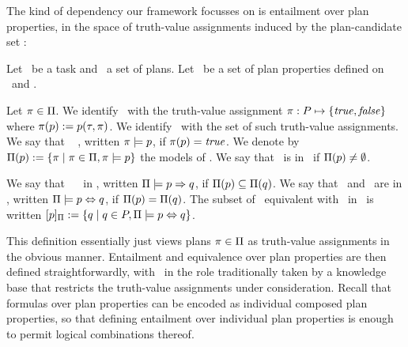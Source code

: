 The kind of dependency our framework focusses on is entailment over
plan properties, in the space of truth-value assignments induced by
the plan-candidate set \plans:

\begin{definition}[Entailment]
Let \task\ be a task and \plans\ a set of plans. Let \props\ be a set
of plan properties defined on \task\ and \plans.

Let $\pi \in \Pi$. We identify \plan\ with the truth-value
assignment $\pi : P \mapsto \{\mathit{true}, \mathit{false}\}$ where
$\pi(p) := p(\tau,\pi)$. We identify \plans\ with the set
of such truth-value assignments. We say that
\plan\  \prop, written $\pi \models p$, if
$\pi(p) = \mathit{true}$. We denote by $\Pi(p) :=
\{\pi \mid \pi \in \Pi, \pi \models p\}$ the models of
\prop. We say that \prop\ is  in \plans\ if
$\Pi(p) \neq \emptyset$.

We say that \prop\  \propq\ in \plans, written
$\Pi \models p \Rightarrow q$, if $\Pi(p)
\subseteq \Pi(q)$.
%
We say that \prop\ and \propq\ are  in \plans,
written $\Pi \models p \Leftrightarrow q$, if $\Pi(p) =
\Pi(q)$. The subset of \props\ equivalent with
\prop\ in \plans\ is written $[p]_{\Pi} := \{q \mid
q \in P, \Pi \models p \Leftrightarrow q\}$.
\end{definition}


This definition essentially just views plans $\pi \in \Pi$ as
truth-value assignments in the obvious manner. Entailment and
equivalence over plan properties are then defined straightforwardly,
with \plans\ in the role traditionally taken by a knowledge base that
restricts the truth-value assignments under consideration. Recall that
formulas over plan properties can be encoded as individual composed
plan properties, so that defining entailment over individual plan
properties is enough to permit logical combinations thereof.

